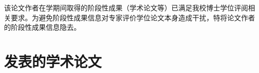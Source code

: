 \begin{resume}
\ifreview
该论文作者在学期间取得的阶段性成果（学术论文等）已满足我校博士学位评阅相关要求。为避免阶段性成果信息对专家评价学位论文本身造成干扰，特将论文作者的阶段性成果信息隐去。
\else

\ifisresumebib

	\begin{refsection}
	\setcounter{gbnamefmtcase}{1}%
	\nocite{ref-1-1-Yang,ref-2-1-杨轶,ref-3-1-杨轶,ref-4-1-Yang,ref-5-1-Wu,ref-6-1-贾泽,ref-7-1-伍晓明}
	
	\setlength{\biblabelsep}{12pt}
	\printbibliography[env=resumebib,heading=subbibliography,title={发表的学术论文}] %

	\end{refsection}


	\begin{refsection}
	\setcounter{gbnamefmtcase}{1}%
	\nocite{ref-8-1-任天令,ref-9-1-Ren}
	
	\setlength{\biblabelsep}{12pt}
	\printbibliography[env=resumebib,heading=subbibliography,title={研究成果}]

	\end{refsection}

\else

  \section*{发表的学术论文} %


\end{resume}
